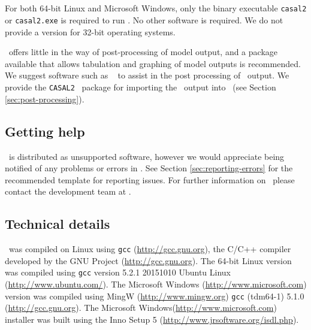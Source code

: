 \subsection{}

For both 64-bit Linux and Microsoft Windows, only the binary executable \texttt{casal2} or \texttt{casal2.exe} is required to run \CNAME . No other software is required. We do not provide a version for 32-bit operating systems. 

\CNAME\ offers little in the way of post-processing of model output, and a package available that allows tabulation and graphing of model outputs is recommended. We suggest software such as \href{http://www.r-project.org}{\R}\ \citep{R} to assist in the post processing of \CNAME\ output. We provide the \texttt{CASAL2} \R\ package for importing the \CNAME\ output into \R\ (see Section \ref{sec:post-processing}).

\subsection{Getting help}

\CNAME\ is distributed as unsupported software, however we would appreciate being notified of any problems or errors in \CNAME. See Section \ref{sec:reporting-errors} for the recommended template for reporting issues. For further information on \CNAME\, please contact the development team at \email .

\subsection{Technical details}\label{sec:tech}

\CNAME\ was compiled on Linux using \texttt{gcc} (\url{http://gcc.gnu.org}), the C/C++ compiler developed by the GNU Project (\url{http://gcc.gnu.org}). The 64-bit Linux  version was compiled using \texttt{gcc} version 5.2.1 20151010 Ubuntu Linux (\url{http://www.ubuntu.com/}). The Microsoft Windows (\url{http://www.microsoft.com}) version was compiled using MingW (\url{http://www.mingw.org}) \texttt{gcc} (tdm64-1) 5.1.0 (\url{http://gcc.gnu.org}). The Microsoft Windows(\url{http://www.microsoft.com}) installer was built using the Inno Setup 5 (\url{http://www.jrsoftware.org/isdl.php}).

